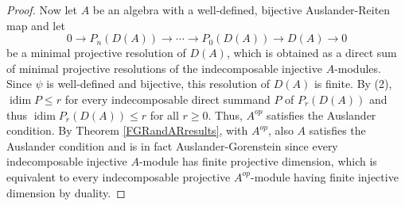 \documentclass[a4paper]{amsart}
\theoremstyle{definition}
\theoremstyle{remark}
\numberwithin{equation}{section}
\newcommand{\idim}{\operatorname{idim}}
\begin{document}
\begin{proof}
Now let $A$ be an algebra with a well-defined, bijective Auslander-Reiten map and let 
$$0 \rightarrow P_n(D(A)) \rightarrow \cdots \rightarrow P_0(D(A)) \rightarrow D(A) \rightarrow 0$$
be a minimal projective resolution of $D(A)$, which is obtained as a direct sum of minimal projective resolutions of the indecomposable injective $A$-modules.
Since $\psi$ is well-defined and bijective, this resolution of $D(A)$ is finite.
By (2), $\idim P \leq r$ for every indecomposable direct summand $P$ of $P_r(D(A))$ and thus $\idim P_r(D(A)) \leq r$ for all $r \geq 0$. Thus, $A^{op}$ satisfies the Auslander condition.
By Theorem \ref{FGRandARresults},  with $A^{op}$, also $A$ satisfies the Auslander condition and is in fact Auslander-Gorenstein since every indecomposable injective $A$-module has finite projective dimension, which is equivalent to every indecomposable projective $A^{op}$-module having finite injective dimension by duality.
\end{proof}
\end{document}
